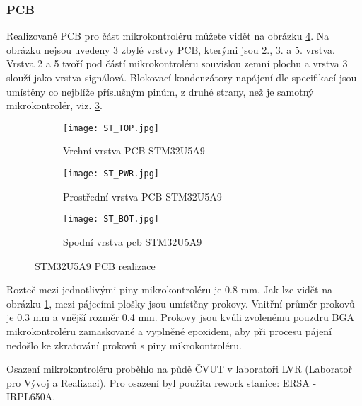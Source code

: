	\subsubsection{PCB}
	Realizované PCB pro část mikrokontroléru můžete vidět na obrázku \ref{fig:ST_layout}. Na obrázku nejsou uvedeny 3 zbylé vrstvy PCB, kterými jsou 2., 3. a 5. vrstva. Vrstva 2 a 5 tvoří pod částí mikrokontroléru souvislou zemní plochu a vrstva 3 slouží jako vrstva signálová. Blokovací kondenzátory napájení dle specifikací \cite{STM32U5A9_RM} jsou umístěny co nejblíže příslušným pinům, z druhé strany, než je samotný mikrokontrolér, viz. \ref{fig:ST_BOT}. 
	\begin{figure}[h!]
		\centering
		\captionsetup{justification=centering}
		\begin{subfigure}[b]{0.3\textwidth}
			\centering
			\texttt{[image: ST\_TOP.jpg]}
			\caption{Vrchní vrstva PCB STM32U5A9}
			\label{fig:ST_TOP}
		\end{subfigure}
		\hfill
		\begin{subfigure}[b]{0.3\textwidth}
			\centering
				\texttt{[image: ST\_PWR.jpg]}
			\caption{Prostřední vrstva PCB STM32U5A9}
			\label{fig:ST_PWR}
		\end{subfigure}
		\hfill
		\begin{subfigure}[b]{0.3\textwidth}
			\centering
				\texttt{[image: ST\_BOT.jpg]}
			\caption{Spodní vrstva pcb STM32U5A9}
			\label{fig:ST_BOT}
		\end{subfigure}
		\caption{STM32U5A9 PCB realizace}
		\label{fig:ST_layout}
	\end{figure}
	Rozteč mezi jednotlivými piny mikrokontroléru je 0.8 mm. Jak lze vidět na obrázku \ref{fig:ST_TOP}, mezi pájecími plošky jsou umístěny prokovy. Vnitřní průměr prokovů je 0.3 mm a vnější rozměr 0.4 mm. Prokovy jsou kvůli zvolenému pouzdru BGA mikrokontroléru zamaskované a vyplněné epoxidem, aby při procesu pájení nedošlo ke zkratování prokovů s piny mikrokontroléru.
	\par Osazení mikrokontroléru proběhlo na půdě ČVUT v laboratoři LVR (Laboratoř pro Vývoj a Realizaci). Pro osazení byl použita rework stanice: ERSA - IRPL650A.
	
